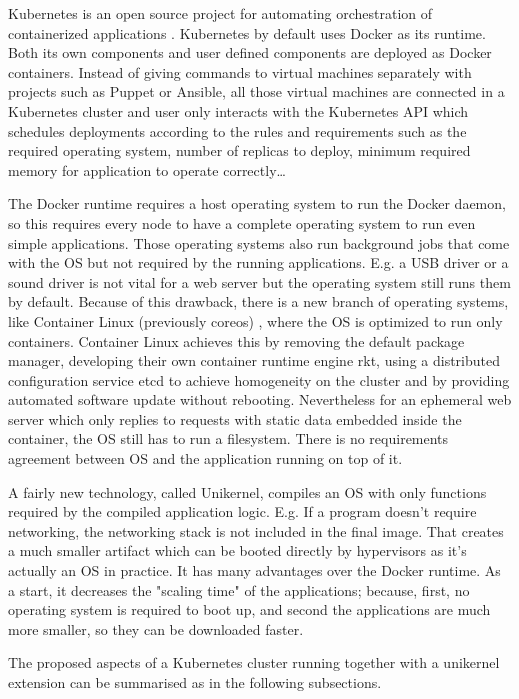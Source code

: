 Kubernetes is an open source project for automating orchestration of containerized applications \cite{Hightower:2017:KUR:3175917}. Kubernetes by default uses Docker as its runtime. Both its own components and user defined components are deployed as Docker containers. Instead of giving commands to virtual machines separately with projects such as Puppet or Ansible, all those virtual machines are connected in a Kubernetes cluster and user only interacts with the Kubernetes API which schedules deployments according to the rules and requirements such as the required operating system, number of replicas to deploy, minimum required memory for application to operate correctly\ldots

The Docker runtime requires a host operating system to run the Docker daemon, so this requires every node to have a complete operating system to run even simple applications. Those operating systems also run background jobs that come with the OS but not required by the running applications. E.g. a USB driver or a sound driver is not vital for a web server but the operating system still runs them by default. Because of this drawback, there is a new branch of operating systems, like Container Linux (previously coreos) \cite{coreos}, where the OS is optimized to run only containers. Container Linux achieves this by removing the default package manager, developing their own container runtime engine rkt, using a distributed configuration service etcd to achieve homogeneity on the cluster and by providing automated software update without rebooting. Nevertheless for an ephemeral web server which only replies to requests with static data embedded inside the container, the OS still has to run a filesystem. There is no requirements agreement between OS and the application running on top of it.

A fairly new technology, called Unikernel, compiles an OS with only functions required by the compiled application logic. E.g. If a program doesn't require networking, the networking stack is not included in the final image. That creates a much smaller artifact which can be booted directly by hypervisors as it's actually an OS in practice. It has many advantages over the Docker runtime. As a start, it decreases the "scaling time" \cite{Podolskiy:2017:QCA:3069383.3069390} of the applications; because, first, no operating system is required to boot up, and second the applications are much more smaller, so they can be downloaded faster.

The proposed aspects of a Kubernetes cluster running together with a unikernel extension can be summarised as in the following subsections.

